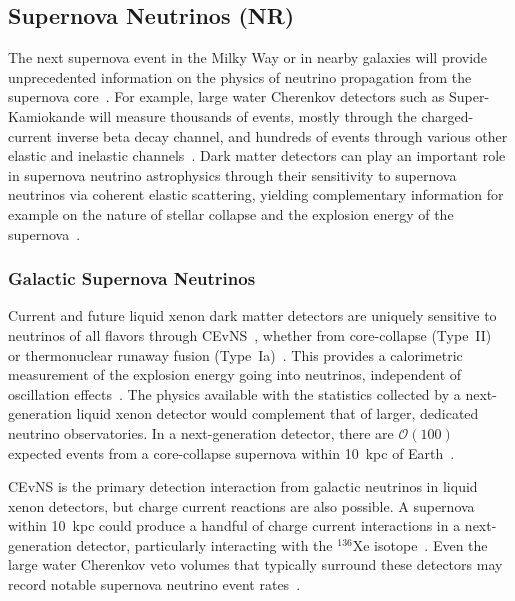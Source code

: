 \subsection{Supernova Neutrinos (NR)}\label{sec:supernovaneutrinos}

The next supernova event in the Milky Way or in nearby galaxies will provide unprecedented information on the physics of neutrino propagation from the supernova core~\cite{Janka:2006fh,Janka:2012wk}. For example, large water Cherenkov detectors such as Super-Kamiokande will measure thousands of events, mostly through the charged-current inverse beta decay channel, and hundreds of events through various other elastic and inelastic channels~\cite{Scholberg:2012id}. Dark matter detectors can play an important role in supernova neutrino astrophysics through their sensitivity to supernova neutrinos via coherent elastic scattering, yielding complementary information for example on the nature of stellar collapse and the explosion energy of the supernova~\cite{Freedman:1977xn}.

\subsubsection{Galactic Supernova Neutrinos}

Current and future liquid xenon dark matter detectors are uniquely sensitive to neutrinos of all flavors through CEvNS~\cite{Horowitz:2003cz,XMASS:2016cmy}, whether from core-collapse (Type~II)~\cite{Chakraborty:2013zua,Lang:2016zhv} or thermonuclear runaway fusion (Type~Ia)~\cite{Raj:2019sci}. This provides a calorimetric measurement of the explosion energy going into neutrinos, independent of oscillation effects~\cite{Lang:2016zhv}. The physics available with the statistics collected by a next-generation liquid xenon detector would complement that of larger, dedicated neutrino observatories. In a next-generation detector, there are $\mathcal{O}(100)$ expected events from a core-collapse supernova within 10~kpc of Earth~\cite{Lang:2016zhv}.

CEvNS is the primary detection interaction from galactic neutrinos in liquid xenon detectors, but charge current reactions are also possible. A supernova within 10~kpc could produce a handful of charge current interactions in a next-generation detector, particularly interacting with the $^{136}$Xe isotope~\cite{Pirinen:2018gsd,Ydrefors2015}. Even the large water Cherenkov veto volumes that typically surround these detectors may record notable supernova neutrino event rates~\cite{Litvinovich:2017smi}. 

